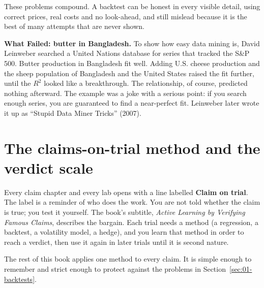 These problems compound. A backtest can be honest in every visible detail, using correct prices, real costs and no look-ahead, and still mislead because it is the best of many attempts that are never shown.

\begin{callout}
\textbf{What Failed: butter in Bangladesh.} To show how easy data mining is, David Leinweber searched a United Nations database for series that tracked the S\&P 500. Butter production in Bangladesh fit well. Adding U.S. cheese production and the sheep population of Bangladesh and the United States raised the fit further, until the $R^2$ looked like a breakthrough. The relationship, of course, predicted nothing afterward. The example was a joke with a serious point: if you search enough series, you are guaranteed to find a near-perfect fit. Leinweber later wrote it up as ``Stupid Data Miner Tricks'' (2007).
\end{callout}

\section{The claims-on-trial method and the verdict scale}
\label{sec:01-method}

Every claim chapter and every lab opens with a line labelled \textbf{Claim on trial}. The label is a reminder of who does the work. You are not told whether the claim is true; you test it yourself. The book's subtitle, \emph{Active Learning by Verifying Famous Claims}, describes the bargain. Each trial needs a method (a regression, a backtest, a volatility model, a hedge), and you learn that method in order to reach a verdict, then use it again in later trials until it is second nature.

The rest of this book applies one method to every claim. It is simple enough to remember and strict enough to protect against the problems in Section~\ref{sec:01-backtests}.

